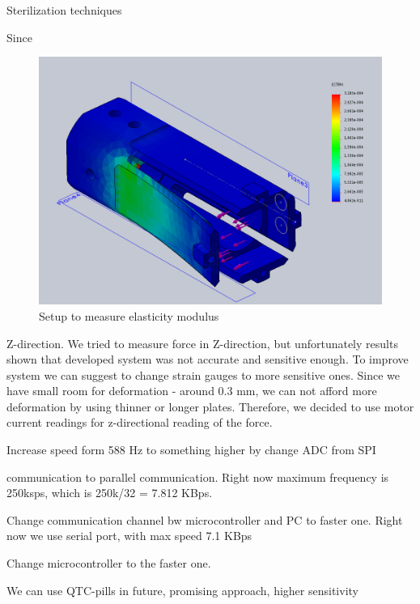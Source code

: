 Sterilization techniques

Since 

\begin{figure}[h]
	\begin{center}
		\includegraphics[width=120mm]{fig/methods/NEW_SLEEVE_STRAIN.png}
	\end{center}
	\vspace{-4mm}
	\caption[Setup to measure elasticity modulus]
	{Setup to measure elasticity modulus}
	\label{fig:ElasModSet}
	\vspace{-2mm}
\end{figure}

Z-direction. We tried to measure force in Z-direction, but unfortunately results shown that developed system was not accurate and sensitive enough. To improve system we can suggest to change strain gauges to more sensitive ones. Since we have small room for deformation - around 0.3 mm, we can not afford more deformation by using thinner or longer plates. Therefore, we decided to use motor current readings for z-directional reading of the force.

Increase speed form 588 Hz to something higher by change ADC from SPI 

communication to parallel communication. Right now maximum frequency is 
250ksps, which is 250k/32 = 7.812 KBps.

 Change communication channel bw microcontroller and PC to faster one. Right 
 now we use serial port, with max speed 7.1 KBps 
 
Change microcontroller to the faster one. 

We can use QTC-pills in future, promising approach, higher sensitivity 
